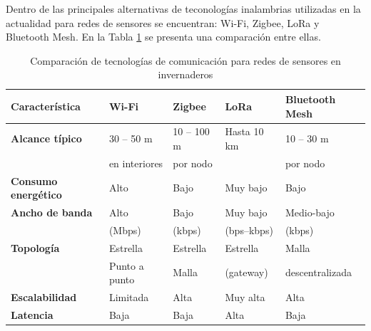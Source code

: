 Dentro de las principales alternativas de teconologías inalambrias utilizadas en la actualidad para redes de sensores se encuentran: Wi-Fi, Zigbee, LoRa y Bluetooth Mesh. En la Tabla \ref{tab:comparacion_tecnologias} se presenta una comparación entre ellas.   

\begin{table}[h]
\centering
\caption{Comparación de tecnologías de comunicación para redes de sensores en invernaderos}
\label{tab:comparacion_tecnologias}
\begin{tabular}{l l l l l}
\toprule
\textbf{Característica} & \textbf{Wi-Fi} & \textbf{Zigbee} & \textbf{LoRa} & \textbf{Bluetooth Mesh} \\
\midrule
\textbf{Alcance típico}
 & 30 -- 50 m & 10 -- 100 m & Hasta 10 km & 10 -- 30 m \\
 & en interiores & por nodo &  & por nodo \\
\textbf{Consumo energético} & Alto & Bajo & Muy bajo & Bajo \\
\textbf{Ancho de banda} 
& Alto & Bajo & Muy bajo & Medio-bajo \\
& (Mbps) & (kbps) & (bps--kbps) & (kbps) \\

\textbf{Topología} 
& Estrella & Estrella & Estrella & Malla  \\
& Punto a punto & Malla & (gateway) & descentralizada \\

\textbf{Escalabilidad} 
& Limitada & Alta & Muy alta & Alta \\
\textbf{Latencia} & Baja & Baja & Alta & Baja \\

\bottomrule
\hline
\end{tabular}
\end{table}

